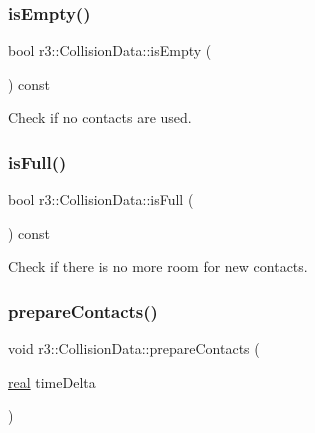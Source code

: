 \mbox{\label{classr3_1_1_collision_data_a3b97a4828252625e891c939ad7ce0064}} 
\subsubsection{\texorpdfstring{is\+Empty()}{isEmpty()}}
{\footnotesize\ttfamily bool r3\+::\+Collision\+Data\+::is\+Empty (\begin{DoxyParamCaption}{ }\end{DoxyParamCaption}) const}



Check if no contacts are used. 

\mbox{\label{classr3_1_1_collision_data_aebb099e77b79235942a9c0166eb66a78}} 
\subsubsection{\texorpdfstring{is\+Full()}{isFull()}}
{\footnotesize\ttfamily bool r3\+::\+Collision\+Data\+::is\+Full (\begin{DoxyParamCaption}{ }\end{DoxyParamCaption}) const}



Check if there is no more room for new contacts. 

\mbox{\label{classr3_1_1_collision_data_a7a8dcf7d0b2cdd99d9c96dabc2a4fbc9}} 
\subsubsection{\texorpdfstring{prepare\+Contacts()}{prepareContacts()}}
{\footnotesize\ttfamily void r3\+::\+Collision\+Data\+::prepare\+Contacts (\begin{DoxyParamCaption}\item[{\mbox{\hyperlink{namespacer3_ab2016b3e3f743fb735afce242f0dc1eb}{real}}}]{time\+Delta }\end{DoxyParamCaption})}

